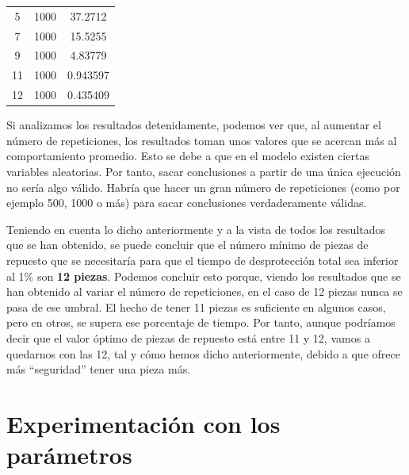 \documentclass[11pt,a4paper]{report}
\begin{document}
\begin{longtable}{c|c|c}
5                                                                        & 1000                        & 37.2712                                                                                    \\
7                                                                        & 1000                        & 15.5255                                                                                    \\
9                                                                        & 1000                        & 4.83779                                                                                    \\
11                                                                       & 1000                        & 0.943597                                                                                   \\
12                                                                       & 1000                        & 0.435409       
\end{longtable}

Si analizamos los resultados detenidamente, podemos ver que, al aumentar el número de repeticiones, los resultados
toman unos valores que se acercan más al comportamiento promedio. Esto se debe a que en el modelo existen ciertas
variables aleatorias. Por tanto, sacar conclusiones a partir de una única ejecución no sería algo válido. Habría
que hacer un gran número de repeticiones (como por ejemplo 500, 1000 o más) para sacar conclusiones verdaderamente válidas.

Teniendo en cuenta lo dicho anteriormente y a la vista de todos los resultados que se han obtenido,
se puede concluir que el número mínimo de piezas de repuesto que se necesitaría para que el
tiempo de desprotección total sea inferior al 1\% son \textbf{12 piezas}. Podemos concluir esto porque, viendo
los resultados que se han obtenido al variar el número de repeticiones, en el caso de 12 piezas nunca se pasa de ese
umbral. El hecho de tener 11 piezas es suficiente en algunos casos, pero en otros, se supera ese porcentaje de tiempo.
Por tanto, aunque podríamos decir que el valor óptimo de piezas de repuesto está entre 11 y 12, vamos a quedarnos con
las 12, tal y cómo hemos dicho anteriormente, debido a que ofrece más ``seguridad'' tener una pieza más.

\section{Experimentación con los parámetros}
\end{document}
